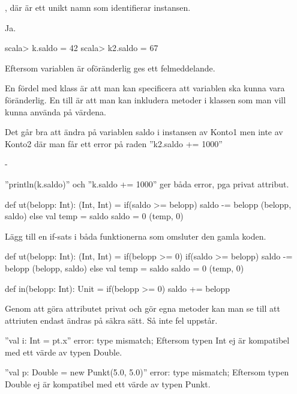 \Task %

\Subtask  {}, där  är ett unikt namn som identifierar instansen.

\Subtask  Ja.

\Subtask
\begin{REPLnonum}
scala> k.saldo = 42
scala> k2.saldo = 67
\end{REPLnonum}

\Subtask  Eftersom variablen är oföränderlig ges ett felmeddelande.

\Subtask  En fördel med klass är att man kan specificera att variablen ska kunna vara föränderlig. En till är att man kan inkludera metoder i klassen som man vill kunna använda på värdena.

\Task %

\Subtask
Det går bra att ändra på variablen saldo i instansen av Konto1 men inte av Konto2 där man får ett error på raden ''k2.saldo += 1000''

\Subtask -

\Subtask
''println(k.saldo)'' och ''k.saldo += 1000'' ger båda error, pga privat attribut.

\Subtask
\begin{Code}
def ut(belopp: Int): (Int, Int) = {
	if(saldo >= belopp) {
		saldo -= belopp
		(belopp, saldo)
	} else {
		val temp = saldo
		saldo = 0
		(temp, 0)
	}
}
\end{Code}

\Subtask
Lägg till en if-sats i båda funktionerna som omsluter den gamla koden.
\begin{Code}
def ut(belopp: Int): (Int, Int) = {
  if(belopp >= 0) {
    if(saldo >= belopp) {
      saldo -= belopp
      (belopp, saldo)
    } else {
      val temp = saldo
      saldo = 0
      (temp, 0)
    }
  }
}

def in(belopp: Int): Unit = {
  if(belopp >= 0) {
    saldo += belopp
  }
}
\end{Code}

\Subtask
Genom att göra attributet privat och gör egna metoder kan man se till att attriuten endast ändras på säkra sätt. Så inte fel uppstår.

\Task %

\Subtask
''val i: Int = pt.x'' error: type mismatch;
Eftersom typen Int ej är kompatibel med ett värde av typen Double.

''val p: Double = new Punkt(5.0, 5.0)'' error: type mismatch;
Eftersom typen Double ej är kompatibel med ett värde av typen Punkt.

